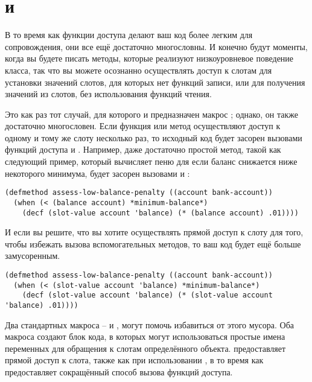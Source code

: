 \section{ и }

В то время как функции доступа делают ваш код более легким для сопровождения, они все ещё
достаточно многословны.  И конечно будут моменты, когда вы будете писать методы, которые
реализуют низкоуровневое поведение класса, так что вы можете осознанно осуществлять доступ
к слотам для установки значений слотов, для которых нет функций записи, или для получения
значений из слотов, без использования функций чтения.

Это как раз тот случай, для которого и предназначен макрос ; однако, он
также достаточно многословен.  Если функция или метод осуществляют доступ к одному и тому
же слоту несколько раз, то исходный код будет засорен вызовами функций доступа и
.  Например, даже достаточно простой метод, такой как следующий пример,
который вычисляет пеню для  если баланс снижается ниже некоторого
минимума, будет засорен вызовами  и :

\begin{lstlisting}
(defmethod assess-low-balance-penalty ((account bank-account))
  (when (< (balance account) *minimum-balance*)
    (decf (slot-value account 'balance) (* (balance account) .01))))
\end{lstlisting}

И если вы решите, что вы хотите осуществлять прямой доступ к слоту для того, чтобы
избежать вызова вспомогательных методов, то ваш код будет ещё больше замусоренным.

\begin{lstlisting}
(defmethod assess-low-balance-penalty ((account bank-account))
  (when (< (slot-value account 'balance) *minimum-balance*)
    (decf (slot-value account 'balance) (* (slot-value account 'balance) .01))))
\end{lstlisting}

Два стандартных макроса --  и , могут помочь
избавиться от этого мусора.  Оба макроса создают блок кода, в которых могут использоваться
простые имена переменных для обращения к слотам определённого объекта.  
предоставляет прямой доступ к слота, также как при использовании , в то
время как  предоставляет сокращённый способ вызова функций доступа.

